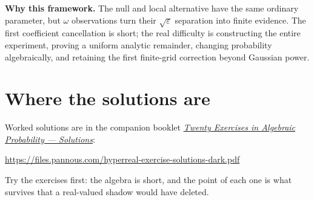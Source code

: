 \documentclass[11pt]{article}
\newcommand{\eps}{\varepsilon}
\begin{document}
\textbf{Why this framework.} The null and local alternative have the same ordinary
parameter, but $\omega$ observations turn their $\sqrt{\eps}$ separation
into finite evidence. The first coefficient cancellation is short; the real
difficulty is constructing the entire experiment, proving a uniform analytic
remainder, changing probability algebraically, and retaining the first
finite-grid correction beyond Gaussian power.


\section*{Where the solutions are}

Worked solutions are in the companion booklet
\href{https://files.pannous.com/hyperreal-exercise-solutions-dark.pdf}{\emph{Twenty Exercises in Algebraic Probability --- Solutions}}:
\begin{center}\small\url{https://files.pannous.com/hyperreal-exercise-solutions-dark.pdf}\end{center}
Try the exercises first: the algebra is short, and the point of each one is
what survives that a real-valued shadow would have deleted.
\end{document}
